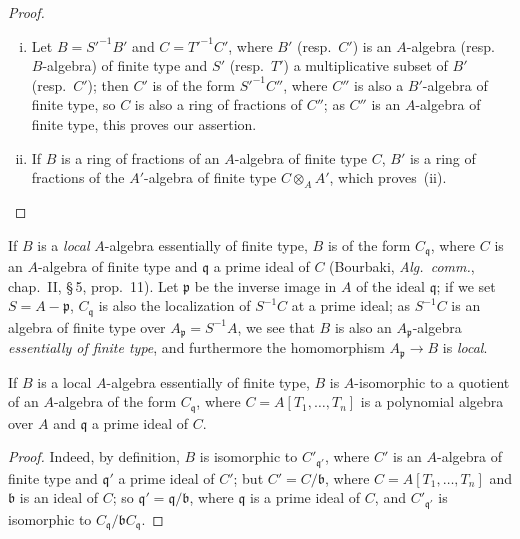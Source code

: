 \begin{proof}
\begin{enumerate}[(i)]
  \item Let $B=S'^{-1}B'$ and $C=T'^{-1}C'$, where $B'$ (resp.\ $C'$) is an $A$-algebra (resp.\
    $B$-algebra) of finite type and $S'$ (resp.\ $T'$) a multiplicative subset of $B'$ (resp.\ $C'$);
    then $C'$ is of the form $S'^{-1}C''$, where $C''$ is also a $B'$-algebra of finite type, so $C$ is also
    a ring of fractions of $C''$; as $C''$ is an $A$-algebra of finite type, this proves
    our assertion.
  \item If $B$ is a ring of fractions of an $A$-algebra of finite type $C$, $B'$ is a ring
    of fractions of the $A'$-algebra of finite type $C\otimes_A A'$, which proves~(ii).
\end{enumerate}
\end{proof}

\begin{env}[1.3.10]
\label{IV.1.3.10}
If $B$ is a \emph{local} $A$-algebra essentially of finite type, $B$ is of the
form $C_{\mathfrak{q}}$, where $C$ is an $A$-algebra of finite type and $\mathfrak{q}$ a prime ideal of $C$ (Bourbaki,
\emph{Alg.\ comm.}, chap.~II, \S\,5, prop.~11). Let $\mathfrak{p}$ be the inverse image in $A$ of the ideal $\mathfrak{q}$; if we set
$S=A-\mathfrak{p}$, $C_{\mathfrak{q}}$ is also the localization of $S^{-1}C$ at a prime ideal; as $S^{-1}C$
is an algebra of finite type over $A_{\mathfrak{p}}=S^{-1}A$, we see that $B$ is also an $A_{\mathfrak{p}}$-algebra \emph{essentially
of finite type}, and furthermore the homomorphism $A_{\mathfrak{p}}\to B$ is \emph{local}.
\end{env}

\begin{proposition}[1.3.11]
\label{IV.1.3.11}
If $B$ is a local $A$-algebra essentially of finite type, $B$ is
$A$-isomorphic to a quotient of an $A$-algebra of the form $C_{\mathfrak{q}}$, where
$C=A[T_1,\ldots,T_n]$ is a polynomial algebra over $A$ and $\mathfrak{q}$ a prime ideal of $C$.
\end{proposition}

\begin{proof}
Indeed, by definition, $B$ is isomorphic to $C'_{\mathfrak{q}'}$, where $C'$ is an $A$-algebra of finite type
and $\mathfrak{q}'$ a prime ideal of $C'$; but $C'=C/\mathfrak{b}$, where $C=A[T_1,\ldots,T_n]$ and $\mathfrak{b}$ is an
ideal of $C$; so $\mathfrak{q}'=\mathfrak{q}/\mathfrak{b}$, where $\mathfrak{q}$ is a prime ideal of $C$, and $C'_{\mathfrak{q}'}$ is isomorphic to $C_{\mathfrak{q}}/\mathfrak{b} C_{\mathfrak{q}}$.
\end{proof}

